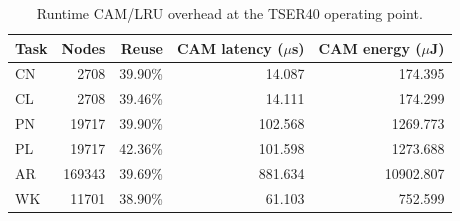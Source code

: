 \begin{table}[t]
\centering
\caption{Runtime CAM/LRU overhead at the TSER40 operating point.}
\label{tab:cam-overhead}
\begin{tabular}{lrrrr}
\toprule
Task & Nodes & Reuse & CAM latency ($\mu$s) & CAM energy ($\mu$J) \\
\midrule
CN & 2708 & 39.90\% & 14.087 & 174.395 \\
CL & 2708 & 39.46\% & 14.111 & 174.299 \\
PN & 19717 & 39.90\% & 102.568 & 1269.773 \\
PL & 19717 & 42.36\% & 101.598 & 1273.688 \\
AR & 169343 & 39.69\% & 881.634 & 10902.807 \\
WK & 11701 & 38.90\% & 61.103 & 752.599 \\
\bottomrule
\end{tabular}
\end{table}
